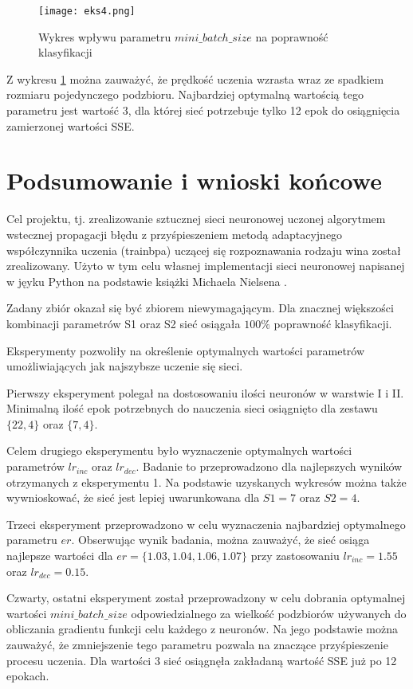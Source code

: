 \documentclass[12pt,twoside]{article}
\begin{document}
\begin{figure}[H]
	\centering
	\texttt{[image: eks4.png]}
	\caption{Wykres wpływu parametru $mini\_batch\_size$ na poprawność klasyfikacji}
	\label{ryseks4}
\end{figure}

Z wykresu \ref{ryseks4} można zauważyć, że prędkość uczenia wzrasta wraz ze spadkiem rozmiaru pojedynczego podzbioru. Najbardziej optymalną wartością tego parametru jest wartość 3, dla której sieć potrzebuje tylko 12 epok do osiągnięcia zamierzonej wartości SSE. 


\clearpage
\section{Podsumowanie i wnioski końcowe}

Cel projektu, tj. zrealizowanie sztucznej sieci neuronowej uczonej algorytmem wstecznej propagacji błędu z przyśpieszeniem metodą adaptacyjnego współczynnika uczenia (trainbpa) uczącej się rozpoznawania rodzaju wina został zrealizowany. Użyto w tym celu własnej implementacji sieci neuronowej napisanej w jęyku Python na podstawie książki Michaela Nielsena \cite{nielsen}. 

Zadany zbiór okazał się być zbiorem niewymagającym. Dla znacznej większości kombinacji parametrów S1 oraz S2 sieć osiągała $100\%$ poprawność klasyfikacji. 

Eksperymenty pozwoliły na określenie optymalnych wartości parametrów umożliwiających jak najszybsze uczenie się sieci. 

Pierwszy eksperyment polegał na dostosowaniu ilości neuronów w warstwie I i II. Minimalną ilość epok potrzebnych do nauczenia sieci osiągnięto dla zestawu $\{22,4\}$ oraz $\{7,4\}$. 

Celem drugiego eksperymentu było wyznaczenie optymalnych wartości parametrów $lr_{inc}$ oraz $lr_{dec}$. Badanie to przeprowadzono dla najlepszych wyników otrzymanych z eksperymentu 1. Na podstawie uzyskanych wykresów można także wywnioskować, że sieć jest lepiej uwarunkowana dla $S1 = 7$ oraz $S2 = 4$.

Trzeci eksperyment przeprowadzono w celu wyznaczenia najbardziej optymalnego parametru $er$. Obserwując wynik badania, można zauważyć, że sieć osiąga najlepsze wartości dla $er = \{1.03, 1.04, 1.06, 1.07\}$ przy zastosowaniu $lr_{inc}=1.55$ oraz $lr_{dec}=0.15$. 

Czwarty, ostatni eksperyment został przeprowadzony w celu dobrania optymalnej wartości $mini\_batch\_size$ odpowiedzialnego za wielkość podzbiorów używanych do obliczania gradientu funkcji celu każdego z neuronów. Na jego podstawie można zauważyć, że zmniejszenie tego parametru pozwala na znaczące przyśpieszenie procesu uczenia. Dla wartości $3$ sieć osiągnęła zakładaną wartość SSE już po 12 epokach.
\end{document}
